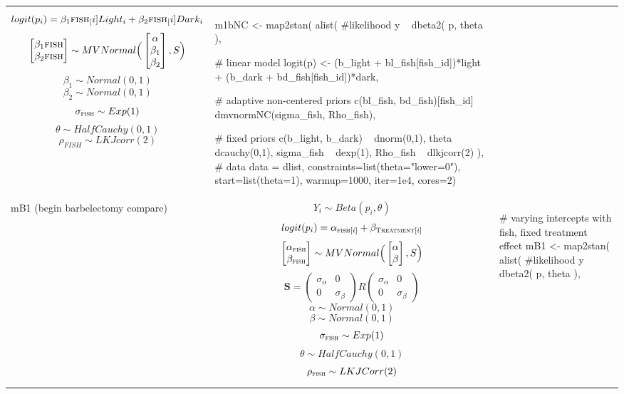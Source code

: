 \begin{longtable}{p{} |p{} |p{} }
\small  
$$ logit(p_i) =  \beta_1{\textsc{fish}_[i]} Light_i  + \beta_2{\textsc{fish}_[i]} Dark_i $$
$$
\begin{bmatrix}
\beta_1{\textsc{fish}}\\
\beta_2{\textsc{fish}} \\
\end{bmatrix} \sim MVNormal \Big(
\begin{bmatrix}
\alpha \\
\beta_1 \\
\beta_2 \\
\end{bmatrix}, S \Big)
$$
$$ \beta_1  \sim Normal(0,1) $$
$$ \beta_2  \sim Normal(0,1) $$
$$ \sigma_{\textsc{fish}} \sim Exp(1) $$
$$ \theta \sim HalfCauchy(0, 1) $$
$$ \rho_{FISH} \sim LKJcorr(2) $$
&
{\begin{mylist}
m1bNC <- map2stan(
  alist(
    #likelihood
    y ~ dbeta2( p, theta ),
    
    # linear model
    logit(p) <- (b_light + bl_fish[fish_id])*light + 
    (b_dark + bd_fish[fish_id])*dark,
    
    # adaptive non-centered priors 
    c(bl_fish, bd_fish)[fish_id] ~ dmvnormNC(sigma_fish, 
    Rho_fish),
    
    # fixed priors
    c(b_light, b_dark) ~ dnorm(0,1),
    theta ~ dcauchy(0,1),
    sigma_fish ~ dexp(1),
    Rho_fish ~ dlkjcorr(2)
  ),
  # data
  data = dlist,
  constraints=list(theta="lower=0"),
  start=list(theta=1), warmup=1000, iter=1e4, cores=2)  \end{mylist}}
\\ %
mB1 (begin barbelectomy compare) & %
$$ Y_i \sim Beta(p_i, \theta) $$
\small $$ logit(p_i) =  \alpha_{\textsc{fish}[i]} + \beta_{\textsc{Treatment}[i]}$$
$$
\begin{bmatrix}
\alpha_{\textsc{fish}} \\
\beta_{\textsc{fish}}
\end{bmatrix} \sim MVNormal \Big(
\begin{bmatrix}
\alpha \\
\beta
\end{bmatrix}, S \Big)
$$
$$
\mathbf{S} = \left( \begin{array}{cc}
\sigma_\alpha & 0 \\
0 & \sigma_\beta
\end{array} \right) R \left( \begin{array}{cc}
\sigma_\alpha & 0 \\
0 & \sigma_\beta
\end{array} \right)
$$
$$ \alpha  \sim Normal(0,1) $$
$$ \beta  \sim Normal(0,1) $$
$$ \sigma_{\textsc{fish}} \sim Exp(1) $$
$$ \theta \sim HalfCauchy(0, 1) $$
$$ \rho_{\textsc{fish}} \sim LKJCorr(2) $$
&
{\begin{mylist} %
# varying intercepts with fish, fixed treatment effect
mB1 <- map2stan(
    alist(
    #likelihood
    y ~ dbeta2( p, theta ),
    

\end{mylist}}
\end{longtable}
